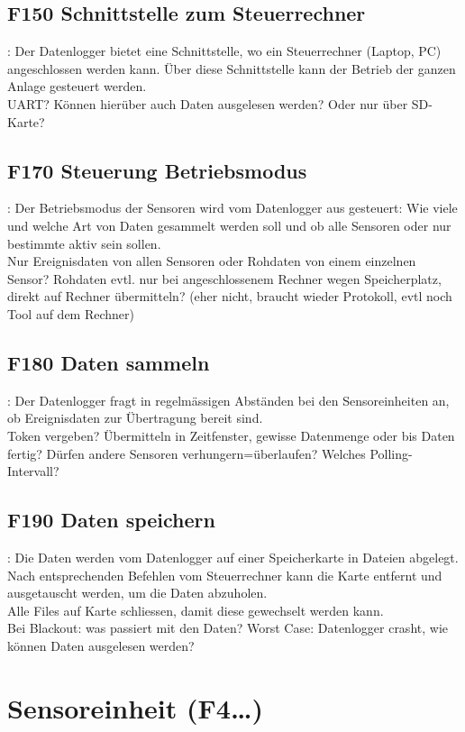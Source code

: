 \subsection{F150 Schnittstelle zum Steuerrechner}: Der Datenlogger bietet eine Schnittstelle, wo ein Steuerrechner (Laptop, PC) angeschlossen werden kann. Über diese Schnittstelle kann der Betrieb der ganzen Anlage gesteuert werden.\\
UART? Können hierüber auch Daten ausgelesen werden? Oder nur über SD-Karte?
 
\subsection{F170 Steuerung Betriebsmodus}: Der Betriebsmodus der Sensoren wird vom Datenlogger aus gesteuert: Wie viele und welche Art von Daten gesammelt werden soll und ob alle Sensoren oder nur bestimmte aktiv sein sollen. \\
Nur Ereignisdaten von allen Sensoren oder Rohdaten von einem einzelnen Sensor? Rohdaten evtl. nur bei angeschlossenem Rechner wegen Speicherplatz, direkt auf Rechner übermitteln? (eher nicht, braucht wieder Protokoll, evtl noch Tool auf dem Rechner)

\subsection{F180 Daten sammeln}: Der Datenlogger fragt in regelmässigen Abständen bei den Sensoreinheiten an, ob Ereignisdaten zur Übertragung bereit sind.\\
Token vergeben? Übermitteln in Zeitfenster, gewisse Datenmenge oder bis Daten fertig? Dürfen andere Sensoren verhungern=überlaufen? Welches Polling-Intervall?

\subsection{F190 Daten speichern}: Die Daten werden vom Datenlogger auf einer Speicherkarte in Dateien abgelegt. Nach entsprechenden Befehlen vom Steuerrechner kann die Karte entfernt und ausgetauscht werden, um die Daten abzuholen.\\
Alle Files auf Karte schliessen, damit diese gewechselt werden kann.\\
Bei Blackout: was passiert mit den Daten? Worst Case: Datenlogger crasht, wie können Daten ausgelesen werden?


\section{Sensoreinheit (F4\ldots)}
